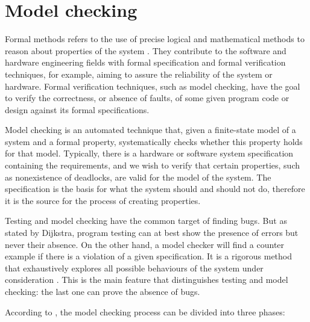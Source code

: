 \section{Model checking}
\label{sec-modelcheck}

Formal methods refers to the use of precise logical and mathematical methods to reason about properties of the system \cite{Eriksson}. They contribute to the software and hardware engineering fields with formal specification and formal verification techniques, for example, aiming to assure the reliability of the system or hardware. Formal verification techniques, such as model checking, have the goal to verify the correctness, or absence of faults, of some given program code or design against its formal specifications\cite{Tian}.

Model checking is an automated technique that, given a finite-state model of a system and a formal property, systematically checks whether this property holds for that model\cite{Baier}. Typically, there is a hardware or software system specification containing the requirements, and we wish to verify that certain properties, such as nonexistence of deadlocks, are valid for the model of the system. The specification is the basis for what the system should and should not do, therefore it is the source for the process of creating properties.

Testing and model checking have the common target of finding bugs. But as stated by Dijkstra\cite{dijkstra}, program testing can at best show the presence of errors but never their absence. On the other hand, a model checker will find a counter example if there is a violation of a given specification. It is a rigorous method that exhaustively explores all possible behaviours of the system under consideration \cite{testVsModelCheck}. This is the main feature that distinguishes testing and model checking: the last one can prove the absence of bugs\cite{patrice}.

According to \cite{Baier}, the model checking process can be divided into three phases:

